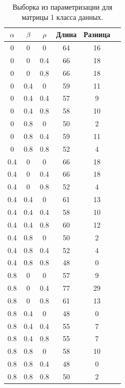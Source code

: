 \documentclass[12pt]{report}
\begin{document}
\begin{table}[H]

	\caption{Выборка из параметризации для матрицы 1 класса данных.}
	\label{tab:v1}
	\begin{center}

		\begin{tabular}{|c@{\hspace{7mm}}|c@{\hspace{7mm}}|c@{\hspace{7mm}}|c@{\hspace{7mm}}|c@{\hspace{7mm}}|c|}

			\hline
			$\alpha$        & $\beta$      & $\rho$      &Длина  & Разница \\

			\hline

0&0&0&64&16\\
0&0&0.4&66&18\\
0&0&0.8&66&18\\
0&0.4&0&59&11\\
0&0.4&0.4&57&9\\
0&0.4&0.8&58&10\\
0&0.8&0&50&2\\
0&0.8&0.4&59&11\\
0&0.8&0.8&52&4\\
\hline
0.4&0&0&66&18\\
0.4&0&0.4&66&18\\
0.4&0&0.8&52&4\\
0.4&0.4&0&61&13\\
0.4&0.4&0.4&58&10\\
0.4&0.4&0.8&60&12\\
0.4&0.8&0&50&2\\
0.4&0.8&0.4&52&4\\
0.4&0.8&0.8&48&0\\
\hline
0.8&0&0&57&9\\
0.8&0&0.4&77&29\\
0.8&0&0.8&61&13\\
0.8&0.4&0&48&0\\
0.8&0.4&0.4&55&7\\
0.8&0.4&0.8&55&7\\
0.8&0.8&0&58&10\\
0.8&0.8&0.4&48&0\\
0.8&0.8&0.8&50&2\\
\hline

		\end{tabular}
	\end{center}
\end{table}
\end{document}
